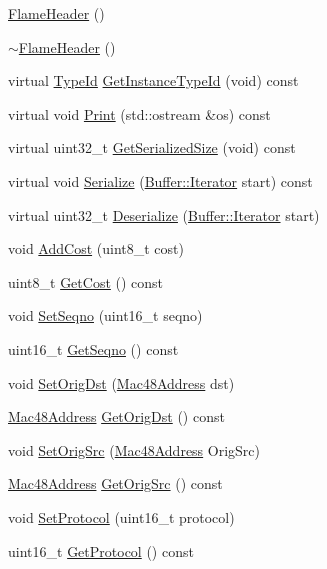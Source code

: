 \begin{DoxyCompactItemize}
\item 
\hyperlink{classns3_1_1flame_1_1FlameHeader_a49848c891f70fad720e28ad40e163ae1}{Flame\+Header} ()
\item 
\hyperlink{classns3_1_1flame_1_1FlameHeader_a419f00a5e8886fb25976328e7b11e13c}{$\sim$\+Flame\+Header} ()
\item 
virtual \hyperlink{classns3_1_1TypeId}{Type\+Id} \hyperlink{classns3_1_1flame_1_1FlameHeader_a2530174c83aecc7fe9c1d8960e8c6de4}{Get\+Instance\+Type\+Id} (void) const 
\item 
virtual void \hyperlink{classns3_1_1flame_1_1FlameHeader_af227b1e4eab39b8281b927e6e8d2ebc9}{Print} (std\+::ostream \&os) const 
\item 
virtual uint32\+\_\+t \hyperlink{classns3_1_1flame_1_1FlameHeader_a8c883932af0391d2ec102706f642468d}{Get\+Serialized\+Size} (void) const 
\item 
virtual void \hyperlink{classns3_1_1flame_1_1FlameHeader_a0d6c503e7e001b62b3fc4bdace3f3f64}{Serialize} (\hyperlink{classns3_1_1Buffer_1_1Iterator}{Buffer\+::\+Iterator} start) const 
\item 
virtual uint32\+\_\+t \hyperlink{classns3_1_1flame_1_1FlameHeader_ada911cbb255eb829e842812dce4b2fc7}{Deserialize} (\hyperlink{classns3_1_1Buffer_1_1Iterator}{Buffer\+::\+Iterator} start)
\item 
void \hyperlink{classns3_1_1flame_1_1FlameHeader_a573abbf4a02c3259975d3106bb3d06d9}{Add\+Cost} (uint8\+\_\+t cost)
\item 
uint8\+\_\+t \hyperlink{classns3_1_1flame_1_1FlameHeader_a4adaa695aede99ed7d67d697ee62d57c}{Get\+Cost} () const 
\item 
void \hyperlink{classns3_1_1flame_1_1FlameHeader_adeab63a707e6c0d0805de10f8a90af8e}{Set\+Seqno} (uint16\+\_\+t seqno)
\item 
uint16\+\_\+t \hyperlink{classns3_1_1flame_1_1FlameHeader_a2090eb5571f532fe7b5d14c573af01e5}{Get\+Seqno} () const 
\item 
void \hyperlink{classns3_1_1flame_1_1FlameHeader_aa2e8f7035ae01d6295f5a518a1f121ae}{Set\+Orig\+Dst} (\hyperlink{classns3_1_1Mac48Address}{Mac48\+Address} dst)
\item 
\hyperlink{classns3_1_1Mac48Address}{Mac48\+Address} \hyperlink{classns3_1_1flame_1_1FlameHeader_a0776de503c8b78684b96973c33099b56}{Get\+Orig\+Dst} () const 
\item 
void \hyperlink{classns3_1_1flame_1_1FlameHeader_a5475967643540b99cfef528c20ed5c16}{Set\+Orig\+Src} (\hyperlink{classns3_1_1Mac48Address}{Mac48\+Address} Orig\+Src)
\item 
\hyperlink{classns3_1_1Mac48Address}{Mac48\+Address} \hyperlink{classns3_1_1flame_1_1FlameHeader_ad76b96aa35d9b0582e82809c398a7db2}{Get\+Orig\+Src} () const 
\item 
void \hyperlink{classns3_1_1flame_1_1FlameHeader_ab077d45600d4d2a6722b09bfbe16f667}{Set\+Protocol} (uint16\+\_\+t protocol)
\item 
uint16\+\_\+t \hyperlink{classns3_1_1flame_1_1FlameHeader_a8d18ecdcf29706f9e97a05cd1c7e82cc}{Get\+Protocol} () const 
\end{DoxyCompactItemize}
